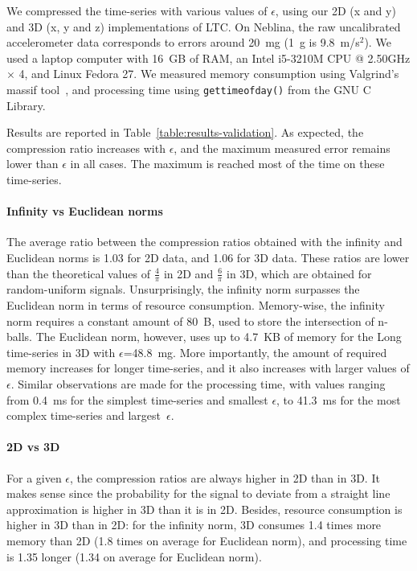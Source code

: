 We compressed the time-series with various values of $\epsilon$, using 
our 2D (x and y) and 3D (x, y and z) implementations of LTC. On 
Neblina, the raw uncalibrated accelerometer data corresponds to errors 
around 20~mg (1~g is 9.8~m/s$^2$). We used a 
laptop computer with 16~GB of RAM, an Intel i5-3210M CPU @ 2.50GHz 
$\times$ 4, and Linux Fedora 27. We measured memory consumption using 
Valgrind's massif 
tool~\cite{nethercote2006building}, 
and processing time using \texttt{gettimeofday()} from the GNU C 
Library. 

Results are reported in Table~\ref{table:results-validation}. 
As expected, the compression ratio increases with $\epsilon$, and the 
maximum measured error remains lower than $\epsilon$ in all cases. The 
maximum is reached most of the time on these time-series.

\paragraph{Infinity vs Euclidean norms}
The average ratio between the compression ratios obtained with the infinity and
Euclidean norms is 1.03 for 2D data, and 1.06 for 3D data. These ratios are
lower than the theoretical values of $\frac{4}{\pi}$ in 2D and $\frac{6}{\pi}$
in 3D, which are obtained for random-uniform signals. Unsurprisingly, the
infinity norm surpasses the Euclidean norm in terms of resource consumption.
Memory-wise, the infinity norm requires a constant amount of 80~B, used to store
the intersection of n-balls. The Euclidean norm, however, uses up to 4.7~KB of
memory for the Long time-series in 3D with $\epsilon$=48.8~mg. More importantly,
the amount of required memory increases for longer time-series, and it also
increases with larger values of $\epsilon$. Similar observations are made for
the processing time, with values ranging from 0.4~ms for the simplest
time-series and smallest $\epsilon$, to 41.3~ms for the most complex time-series
and largest~$\epsilon$.

\paragraph{2D vs 3D}
For a given $\epsilon$, the compression
ratios are always higher in 2D than in 3D. It makes sense since the
probability for the signal to deviate from a straight line
approximation is higher in 3D than it is in 2D. Besides, resource
consumption is higher in 3D than in 2D: for the infinity norm, 3D
consumes 1.4 times more memory than 2D (1.8 times on average for
Euclidean norm), and processing time is 1.35 longer (1.34 on
average for Euclidean norm).

